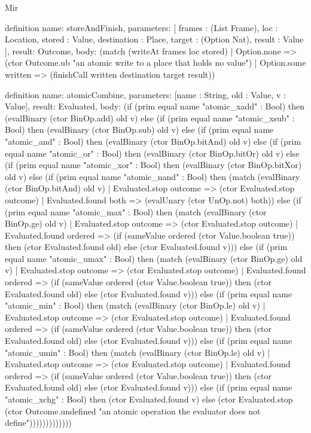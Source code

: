 \begin{lexlean}{Mir}
\begin{semanticmodule}
definition{
  name: storeAndFinish,
  parameters: [
    frames : (List Frame),
    loc : Location,
    stored : Value,
    destination : Place,
    target : (Option Nat),
    result : Value
  ],
  result: Outcome,
  body: (match (writeAt frames loc stored)
    | Option.none => (ctor Outcome.ub "an atomic write to a place that holds no value")
    | Option.some written => (finishCall written destination target result))
}

definition{
  name: atomicCombine,
  parameters: [name : String, old : Value, v : Value],
  result: Evaluated,
  body: (if (prim equal name "atomic_xadd" : Bool) then (evalBinary (ctor BinOp.add) old v) else (if (prim equal name "atomic_xsub" : Bool) then (evalBinary (ctor BinOp.sub) old v) else (if (prim equal name "atomic_and" : Bool) then (evalBinary (ctor BinOp.bitAnd) old v) else (if (prim equal name "atomic_or" : Bool) then (evalBinary (ctor BinOp.bitOr) old v) else (if (prim equal name "atomic_xor" : Bool) then (evalBinary (ctor BinOp.bitXor) old v) else (if (prim equal name "atomic_nand" : Bool) then (match (evalBinary (ctor BinOp.bitAnd) old v)
    | Evaluated.stop outcome => (ctor Evaluated.stop outcome)
    | Evaluated.found both => (evalUnary (ctor UnOp.not) both)) else (if (prim equal name "atomic_max" : Bool) then (match (evalBinary (ctor BinOp.ge) old v)
    | Evaluated.stop outcome => (ctor Evaluated.stop outcome)
    | Evaluated.found ordered => (if (sameValue ordered (ctor Value.boolean true)) then (ctor Evaluated.found old) else (ctor Evaluated.found v))) else (if (prim equal name "atomic_umax" : Bool) then (match (evalBinary (ctor BinOp.ge) old v)
    | Evaluated.stop outcome => (ctor Evaluated.stop outcome)
    | Evaluated.found ordered => (if (sameValue ordered (ctor Value.boolean true)) then (ctor Evaluated.found old) else (ctor Evaluated.found v))) else (if (prim equal name "atomic_min" : Bool) then (match (evalBinary (ctor BinOp.le) old v)
    | Evaluated.stop outcome => (ctor Evaluated.stop outcome)
    | Evaluated.found ordered => (if (sameValue ordered (ctor Value.boolean true)) then (ctor Evaluated.found old) else (ctor Evaluated.found v))) else (if (prim equal name "atomic_umin" : Bool) then (match (evalBinary (ctor BinOp.le) old v)
    | Evaluated.stop outcome => (ctor Evaluated.stop outcome)
    | Evaluated.found ordered => (if (sameValue ordered (ctor Value.boolean true)) then (ctor Evaluated.found old) else (ctor Evaluated.found v))) else (if (prim equal name "atomic_xchg" : Bool) then (ctor Evaluated.found v) else (ctor Evaluated.stop (ctor Outcome.undefined "an atomic operation the evaluator does not define")))))))))))))
}


\end{semanticmodule}
\end{lexlean}
